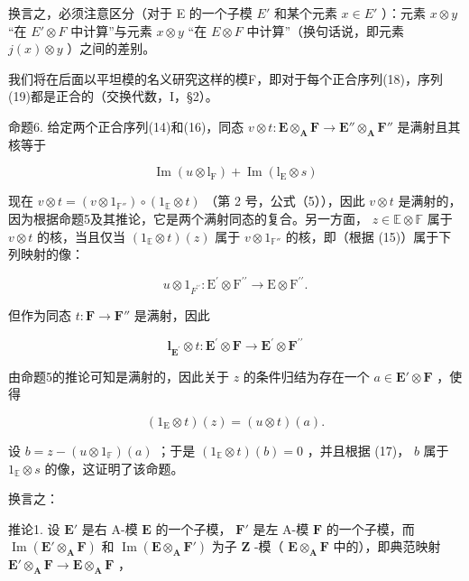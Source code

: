 换言之，必须注意区分（对于 E 的一个子模 \(E'\) 和某个元素 \(x \in E'\) ）：元素 \(x \otimes y\) “在 \(E' \otimes F\) 中计算''与元素 \(x \otimes y\) “在 \(E \otimes F\) 中计算''（换句话说，即元素 \(j(x) \otimes y\) ）之间的差别。

我们将在后面以平坦模的名义研究这样的模F，即对于每个正合序列(18)，序列(19)都是正合的（交换代数，I，§2）。

命题6. 给定两个正合序列(14)和(16)，同态 \(v \otimes t: \mathbf{E} \otimes_{\mathbf{A}} \mathbf{F} \to \mathbf{E}'' \otimes_{\mathbf{A}} \mathbf{F}''\) 是满射且其核等于

\[
\operatorname{Im} (u \otimes \mathrm{l} _ {\mathrm{F}}) + \operatorname{Im} (\mathrm{l} _ {\mathrm{E}} \otimes s)
\]

现在 \(v \otimes t = (v \otimes 1_{\mathbb{F}''}) \circ (1_{\mathbb{E}} \otimes t)\) （第 2 号，公式（5）），因此 \(v \otimes t\) 是满射的，因为根据命题5及其推论，它是两个满射同态的复合。另一方面， \(z \in \mathbb{E} \otimes \mathbb{F}\) 属于 \(v \otimes t\) 的核，当且仅当 \((1_{\mathbb{E}} \otimes t) (z)\) 属于 \(v \otimes 1_{\mathbb{F}''}\) 的核，即（根据 (15)）属于下列映射的像：

\[
u \otimes 1 _ {F ^ {\prime \prime}}: \mathrm{E} ^ {\prime} \otimes \mathrm{F} ^ {\prime \prime} \rightarrow \mathrm{E} \otimes \mathrm{F} ^ {\prime \prime}.
\]

但作为同态 \(t: \mathbf{F} \to \mathbf{F}''\) 是满射，因此

\[
\mathbf {l} _ {\mathbf {E} ^ {\prime}} \otimes t: \mathbf {E} ^ {\prime} \otimes \mathbf {F} \rightarrow \mathbf {E} ^ {\prime} \otimes \mathbf {F} ^ {\prime \prime}
\]

由命题5的推论可知是满射的，因此关于 \(z\) 的条件归结为存在一个 \(a \in \mathbf{E}' \otimes \mathbf{F}\) ，使得

\[
(1 _ {\mathrm{E}} \otimes t) (z) = (u \otimes t) (a).
\]

设 \(b = z - (u \otimes 1_{\mathbb{F}})(a)\) ；于是 \((1_{\mathbb{E}} \otimes t)(b) = 0\) ，并且根据 (17)， \(b\) 属于 \(1_{\mathbb{E}} \otimes s\) 的像，这证明了该命题。

换言之：

推论1. 设 \(\mathbf{E}'\) 是右 A-模 \(\mathbf{E}\) 的一个子模， \(\mathbf{F}'\) 是左 A-模 \(\mathbf{F}\) 的一个子模，而 \(\operatorname{Im}(\mathbf{E}' \otimes_{\mathbf{A}} \mathbf{F})\) 和 \(\operatorname{Im}(\mathbf{E} \otimes_{\mathbf{A}} \mathbf{F}')\) 为子 \(\mathbf{Z}\) -模（ \(\mathbf{E} \otimes_{\mathbf{A}} \mathbf{F}\) 中的），即典范映射 \(\mathbf{E}' \otimes_{\mathbf{A}} \mathbf{F} \to \mathbf{E} \otimes_{\mathbf{A}} \mathbf{F}\) ，

